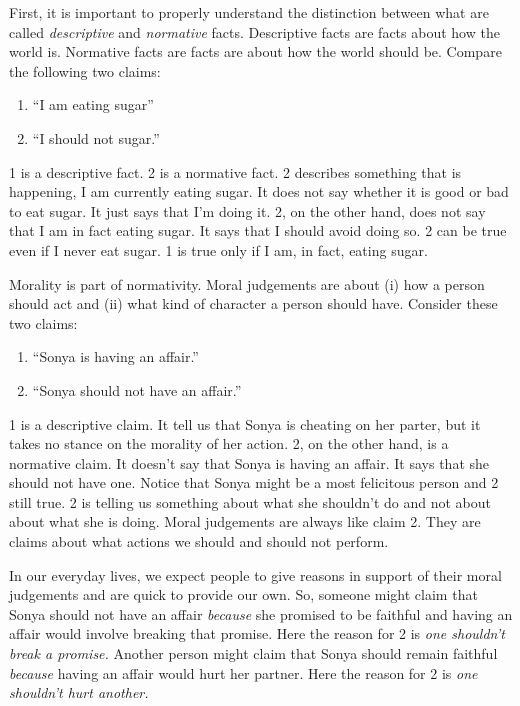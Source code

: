 \documentclass[9pt]{article}
\providecommand{\tightlist}{%
  \setlength{\itemsep}{0pt}\setlength{\parskip}{0pt}}
\begin{document}
First, it is important to properly understand the distinction between
what are called \emph{descriptive} and \emph{normative} facts.
Descriptive facts are facts about how the world is. Normative facts are
facts are about how the world should be. Compare the following two
claims:

\begin{enumerate}
\def\labelenumi{\arabic{enumi}.}
\tightlist
\item
  ``I am eating sugar''
\item
  ``I should not sugar.''
\end{enumerate}

1 is a descriptive fact. 2 is a normative fact. 2 describes something
that is happening, I am currently eating sugar. It does not say whether
it is good or bad to eat sugar. It just says that I'm doing it. 2, on
the other hand, does not say that I am in fact eating sugar. It says
that I should avoid doing so. 2 can be true even if I never eat sugar. 1
is true only if I am, in fact, eating sugar.

Morality is part of normativity. Moral judgements are about (i) how a
person should act and (ii) what kind of character a person should have.
Consider these two claims:

\begin{enumerate}
\def\labelenumi{\arabic{enumi}.}
\tightlist
\item
  ``Sonya is having an affair.''
\item
  ``Sonya should not have an affair.''
\end{enumerate}

1 is a descriptive claim. It tell us that Sonya is cheating on her
parter, but it takes no stance on the morality of her action. 2, on the
other hand, is a normative claim. It doesn't say that Sonya is having an
affair. It says that she should not have one. Notice that Sonya might be
a most felicitous person and 2 still true. 2 is telling us something
about what she shouldn't do and not about about what she is doing. Moral
judgements are always like claim 2. They are claims about what actions
we should and should not perform.

In our everyday lives, we expect people to give reasons in support of
their moral judgements and are quick to provide our own. So, someone
might claim that Sonya should not have an affair \emph{because} she
promised to be faithful and having an affair would involve breaking that
promise. Here the reason for 2 is \emph{one shouldn't break a promise.}
Another person might claim that Sonya should remain faithful
\emph{because} having an affair would hurt her partner. Here the reason
for 2 is \emph{one shouldn't hurt another.}
\end{document}
